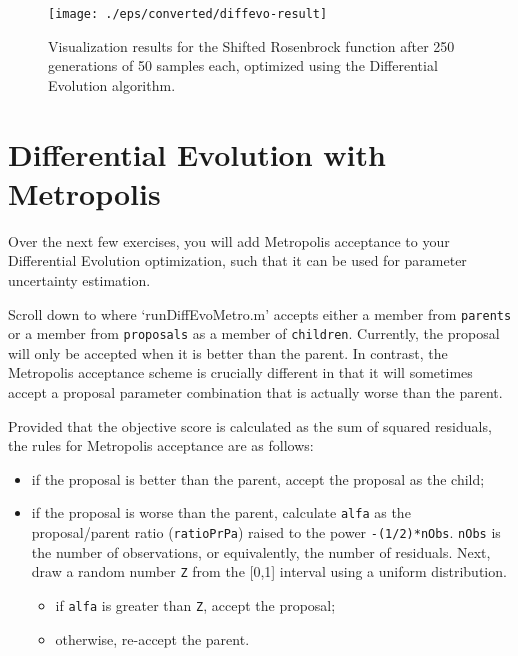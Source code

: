\begin{figure}[htbp]
  \centering
    \texttt{[image: ./eps/converted/diffevo-result]}
  \caption{Visualization results for the Shifted Rosenbrock function after 250
  generations of 50 samples each, optimized using the Differential Evolution
  algorithm.}
  \label{fig:diffevo-result}
\end{figure}












\section{Differential Evolution with Metropolis}

Over the next few exercises, you will add Metropolis acceptance to your
Differential Evolution optimization, such that it can be used for parameter
uncertainty estimation.


Scroll down to where `runDiffEvoMetro.m' accepts either a member from
\texttt{parents} or a member from \texttt{proposals} as a member of
\texttt{children}. Currently, the proposal will only be accepted when it is
better than the parent. In contrast, the Metropolis acceptance scheme is
crucially different in that it will sometimes accept a proposal parameter
combination that is actually worse than the parent. 

Provided that the objective score is calculated as the sum of squared residuals,
the rules for Metropolis acceptance are as follows:
\begin{itemize}
    \item{if the proposal is better than the parent, accept the proposal as the
    child;}
    \item{if the proposal is worse than the parent, calculate \texttt{alfa} as the
    proposal/parent ratio (\texttt{ratioPrPa}) raised to the power
    \texttt{-(1/2)*nObs}. \texttt{nObs} is the number of observations, or
    equivalently, the number of residuals. Next, draw a random number \texttt{Z}
    from the [0,1] interval using a uniform distribution.}
    \begin{itemize}
        \item{if \texttt{alfa} is greater than \texttt{Z}, accept the proposal;}
        \item{otherwise, re-accept the parent.}
    \end{itemize}
\end{itemize}

